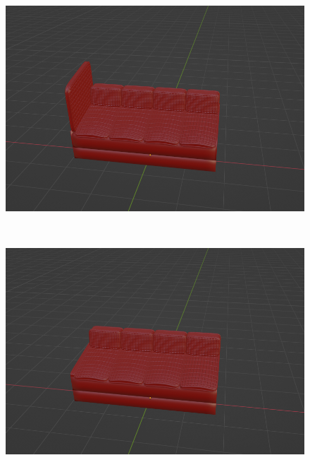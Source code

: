 \begin{figure}[h]
\begin{minipage}[b]{0.48\linewidth}
 \end{minipage}
 \begin{minipage}[b]{0.48\linewidth}
  \centering
  \includegraphics[scale=0.17]{./imgs/sofaParamMean/sideNumMax.png}
 \end{minipage}\\
 \begin{minipage}[b]{0.48\linewidth}
  \centering
  \includegraphics[scale=0.17]{./imgs/sofaParamMean/sideCushionHeightMin.png}
 \end{minipage}
 \begin{minipage}[b]{0.48\linewidth}
  \centering

\end{minipage}
\end{figure}
